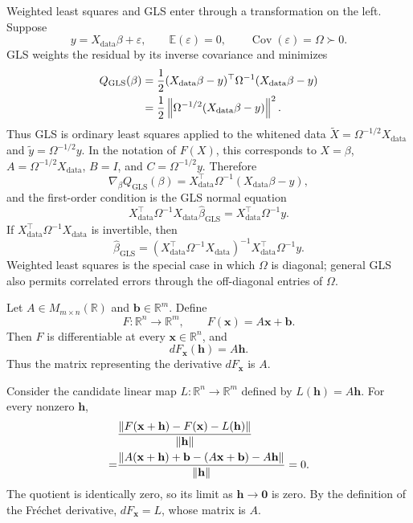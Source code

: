 \begin{remark}
Weighted least squares and GLS enter through a transformation on the left.
Suppose
\[
    y=X_{\mathrm{data}}\beta+\varepsilon,
    \qquad
    \mathbb{E}(\varepsilon)=0,
    \qquad
    \operatorname{Cov}(\varepsilon)=\Omega\succ0.
\]
GLS weights the residual by its inverse covariance and minimizes
\[
\begin{aligned}
    Q_{\mathrm{GLS}}(\beta)
    &=
    \frac12(X_{\mathrm{data}}\beta-y)^\top
    \Omega^{-1}(X_{\mathrm{data}}\beta-y)\\
    &=
    \frac12\left\lVert \Omega^{-1/2}(X_{\mathrm{data}}\beta-y) \right\rVert^2.
\end{aligned}
\]
Thus GLS is ordinary least squares applied to the whitened data
$\widetilde X=\Omega^{-1/2}X_{\mathrm{data}}$ and
$\widetilde y=\Omega^{-1/2}y$. In the notation of $F(X)$, this corresponds to
$X=\beta$, $A=\Omega^{-1/2}X_{\mathrm{data}}$, $B=I$, and
$C=\Omega^{-1/2}y$. Therefore
\[
    \nabla_\beta Q_{\mathrm{GLS}}(\beta)
    =
    X_{\mathrm{data}}^\top\Omega^{-1}
    (X_{\mathrm{data}}\beta-y),
\]
and the first-order condition is the GLS normal equation
\[
    X_{\mathrm{data}}^\top\Omega^{-1}X_{\mathrm{data}}
    \hat\beta_{\mathrm{GLS}}
    =
    X_{\mathrm{data}}^\top\Omega^{-1}y.
\]
If $X_{\mathrm{data}}^\top\Omega^{-1}X_{\mathrm{data}}$ is invertible, then
\[
    \hat\beta_{\mathrm{GLS}}
    =
    (X_{\mathrm{data}}^\top\Omega^{-1}X_{\mathrm{data}})^{-1}
    X_{\mathrm{data}}^\top\Omega^{-1}y.
\]
Weighted least squares is the special case in which $\Omega$ is diagonal;
general GLS also permits correlated errors through the off-diagonal entries of
$\Omega$.
\end{remark}



\begin{proposition}
Let $A\in M_{m\times n}(\mathbb{R})$ and $\mathbf{b}\in\mathbb{R}^m$. Define
\[
    F:\mathbb{R}^n\to\mathbb{R}^m,
    \qquad
    F(\mathbf{x})=A\mathbf{x}+\mathbf{b}.
\]
Then $F$ is differentiable at every $\mathbf{x}\in\mathbb{R}^n$, and
\[
    dF_{\mathbf{x}}(\mathbf{h})=A\mathbf{h}.
\]
Thus the matrix representing the derivative $dF_{\mathbf{x}}$ is $A$.
\end{proposition}

\begin{pfbox}
Consider the candidate linear map $L:\mathbb{R}^n\to\mathbb{R}^m$ defined by
$L(\mathbf{h})=A\mathbf{h}$. For every nonzero $\mathbf{h}$,
\[
\begin{aligned}
    &\frac{\left\lVert F(\mathbf{x}+\mathbf{h})-F(\mathbf{x})-L(\mathbf{h}) \right\rVert}
    {\left\lVert \mathbf{h} \right\rVert}\\
    =& \frac{\left\lVert A(\mathbf{x}+\mathbf{h})+\mathbf{b}
    -(A\mathbf{x}+\mathbf{b})-A\mathbf{h} \right\rVert}{\left\lVert \mathbf{h} \right\rVert}
    =0.
\end{aligned}
\]
The quotient is identically zero, so its limit as $\mathbf{h}\to\mathbf{0}$ is
zero. By the definition of the Fr\'echet derivative,
$dF_{\mathbf{x}}=L$, whose matrix is $A$.
\end{pfbox}

